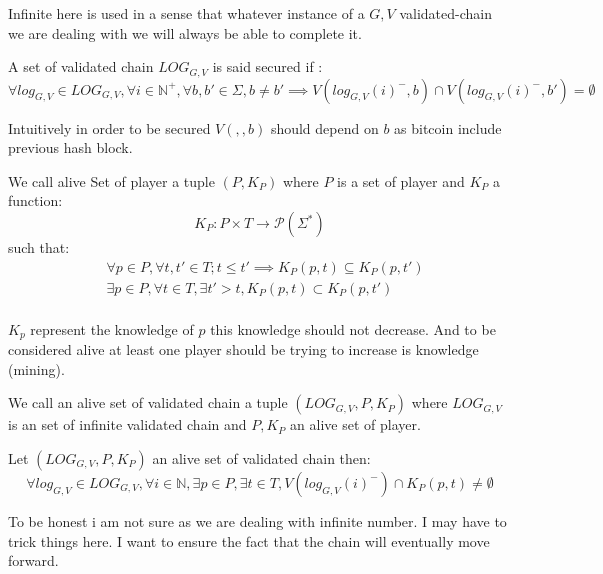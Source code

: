 \begin{myrem}
	Infinite here is used in a sense that whatever instance of a $G,V$ validated-chain we are dealing with we will always be able to complete it.
\end{myrem}

\begin{mydef}
	A set of validated chain $LOG_{G,V}$ is said secured if :
	$$\forall log_{G,V} \in LOG_{G,V}, \forall i \in \mathbb{N}^+ , \forall b,b' \in \Sigma, b\neq b' \implies V(log_{G,V}(i)^-,b)\cap V(log_{G,V}(i)^-,b') = \emptyset$$
\end{mydef}

\begin{myrem}
	Intuitively in order to be secured $V(,,b)$ should depend on $b$ as bitcoin include previous hash block. 
\end{myrem}

\begin{mydef}
	We call  alive Set of player a tuple $(P,K_P)$ where $P$ is a set of player and $K_P$ a function:
	$$K_P : P\times T \rightarrow \mathscr{P}(\Sigma^*)$$
	such that: 
	\begin{align*}
	&\forall p \in P, \forall t,t' \in T; t\leq t' \implies K_P(p,t) \subseteq K_P(p,t') \\
	&\exists p \in P, \forall t \in T, \exists t'>t, K_P(p,t) \subset K_P(p,t') \\
	\end{align*}
\end{mydef}

\begin{myrem}
	$K_p$ represent the knowledge of $p$ this knowledge should not decrease. And to be considered alive at least one player should be trying to increase is knowledge (mining).
\end{myrem}

\begin{mydef}
	We call an alive set of validated chain a tuple $(LOG_{G,V},P,K_P)$ where $LOG_{G,V}$ is an set of infinite validated chain and $P,K_P$ an alive set of player.
\end{mydef}

\begin{myprop*}
	Let $(LOG_{G,V},P,K_P)$ an alive set of validated chain then:
	$$\forall log_{G,V} \in LOG_{G,V}, \forall i \in \mathbb{N}, \exists p \in P, \exists t \in T , V(log_{G,V}(i)^-) \cap K_P(p,t) \neq \emptyset $$
\end{myprop*}
\begin{myrem}
	To be honest i am not sure as we are dealing with infinite number. I may have to trick things here. I want to ensure the fact that the chain will eventually move forward.
\end{myrem}

